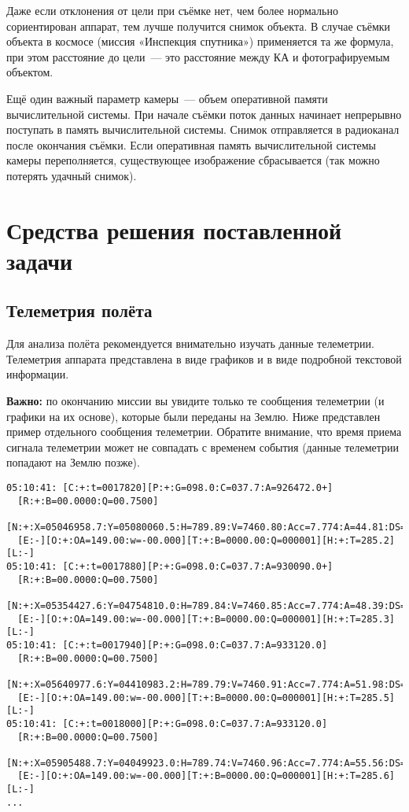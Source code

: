 \documentclass[12pt,a4paper]{article}
\begin{document}
Даже если отклонения от цели при съёмке нет, чем более нормально сориентирован аппарат, тем лучше получится снимок объекта.
В случае съёмки объекта в космосе (миссия «Инспекция спутника») применяется та же формула,
при этом расстояние до цели~--- это расстояние между КА и фотографируемым объектом.

Ещё один важный параметр камеры~--- объем оперативной памяти вычислительной системы. При
начале съёмки поток данных начинает непрерывно поступать в память вычислительной
системы. Снимок отправляется в радиоканал после окончания съёмки. Если оперативная память
вычислительной системы камеры переполняется, существующее изображение сбрасывается (так
можно потерять удачный снимок).

\section{Средства решения поставленной задачи}

\subsection{Телеметрия полёта}
\label{Sec:Telemetry}

Для анализа полёта рекомендуется внимательно изучать данные телеметрии. Телеметрия
аппарата представлена в виде графиков и в виде подробной текстовой информации.

\textbf{Важно:} по окончанию миссии вы увидите только те сообщения телеметрии (и графики
на их основе), которые были переданы на Землю. Ниже представлен пример отдельного
сообщения телеметрии. Обратите внимание, что время приема сигнала телеметрии может не
совпадать с временем события (данные телеметрии попадают на Землю позже).

\begin{verbatim}
05:10:41: [C:+:t=0017820][P:+:G=098.0:C=037.7:A=926472.0+]
  [R:+:B=00.0000:Q=00.7500]
  [N:+:X=05046958.7:Y=05080060.5:H=789.89:V=7460.80:Acc=7.774:A=44.81:DS=-]
  [E:-][O:+:OA=149.00:w=-00.000][T:+:B=0000.00:Q=000001][H:+:T=285.2][L:-]
05:10:41: [C:+:t=0017880][P:+:G=098.0:C=037.7:A=930090.0+]
  [R:+:B=00.0000:Q=00.7500]
  [N:+:X=05354427.6:Y=04754810.0:H=789.84:V=7460.85:Acc=7.774:A=48.39:DS=-]
  [E:-][O:+:OA=149.00:w=-00.000][T:+:B=0000.00:Q=000001][H:+:T=285.3][L:-]
05:10:41: [C:+:t=0017940][P:+:G=098.0:C=037.7:A=933120.0]
  [R:+:B=00.0000:Q=00.7500]
  [N:+:X=05640977.6:Y=04410983.2:H=789.79:V=7460.91:Acc=7.774:A=51.98:DS=-]
  [E:-][O:+:OA=149.00:w=-00.000][T:+:B=0000.00:Q=000001][H:+:T=285.5][L:-]
05:10:41: [C:+:t=0018000][P:+:G=098.0:C=037.7:A=933120.0]
  [R:+:B=00.0000:Q=00.7500]
  [N:+:X=05905488.7:Y=04049923.0:H=789.74:V=7460.96:Acc=7.774:A=55.56:DS=-]
  [E:-][O:+:OA=149.00:w=-00.000][T:+:B=0000.00:Q=000001][H:+:T=285.6][L:-]
...
\end{verbatim}
\end{document}
